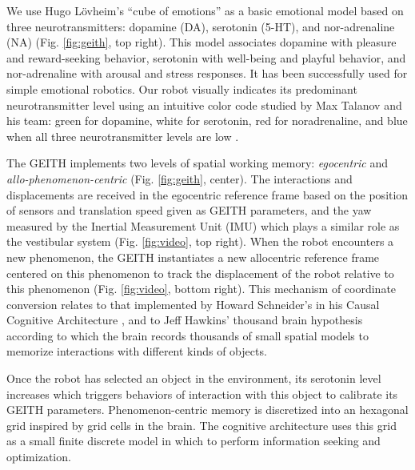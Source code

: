 \documentclass[runningheads]{llncs}
\begin{document}
We use Hugo Lövheim's ``cube of emotions'' \cite{lovheim_new_2012} as a basic emotional model based on three neurotransmitters: dopamine (DA), serotonin (5-HT), and nor-adrenaline (NA) (Fig. \ref{fig:geith}, top right).
This model associates dopamine with pleasure and reward-seeking behavior, serotonin with well-being and playful behavior, and nor-adrenaline with arousal and stress responses.
It has been successfully used for simple emotional robotics.
Our robot visually indicates its predominant neurotransmitter level using an intuitive color code studied by Max Talanov and his team: green for dopamine, white for serotonin, red for noradrenaline, and blue when all three neurotransmitter levels are low \cite{chebotareva_emotional_2019}.

The GEITH implements two levels of spatial working memory: \textit{egocentric} and \textit{allo-phenomenon-centric} (Fig. \ref{fig:geith}, center).  
The interactions and displacements are received in the egocentric reference frame based on the position of sensors and translation speed given as GEITH parameters, and the yaw measured by the Inertial Measurement Unit (IMU) which plays a similar role as the vestibular system %
(Fig. \ref{fig:video}, top right).
When the robot encounters a new phenomenon, the GEITH instantiates a new allocentric reference frame centered on this phenomenon to track the displacement of the robot relative to this phenomenon (Fig. \ref{fig:video}, bottom right). 
This mechanism of coordinate conversion relates to that implemented by Howard Schneider's in his Causal Cognitive Architecture \cite{schneider_emergence_2024}, and to 
Jeff Hawkins' thousand brain hypothesis \cite{hawkins_framework_2019} according to which the brain records thousands of small spatial models to memorize interactions with different kinds of objects.

Once the robot has selected an object in the environment, its serotonin level increases which triggers behaviors of interaction with this object to calibrate its GEITH parameters. 
Phenomenon-centric memory is discretized into an hexagonal grid inspired by grid cells in the brain. 
The cognitive architecture uses this grid as a small finite discrete model in which to perform information seeking and optimization. %
\end{document}

